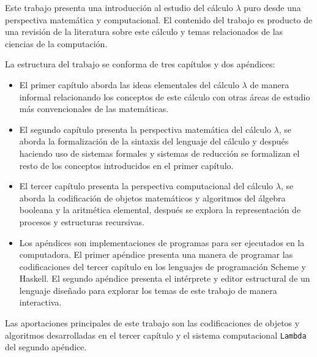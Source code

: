 Este trabajo presenta una introducción al estudio del cálculo \( λ \) puro desde una perspectiva matemática y computacional. El contenido del trabajo es producto de una revisión de la literatura sobre este cálculo y temas relacionados de las ciencias de la computación.

La estructura del trabajo se conforma de tres capítulos y dos apéndices:

\begin{itemize}
\item El primer capítulo aborda las ideas elementales del cálculo \( λ \) de manera informal relacionando los conceptos de este cálculo con otras áreas de estudio más convencionales de las matemáticas.

\item El segundo capítulo presenta la perspectiva matemática del cálculo \( λ \), se aborda la formalización de la sintaxis del lenguaje del cálculo y después haciendo uso de sistemas formales y sistemas de reducción se formalizan el resto de los conceptos introducidos en el primer capítulo.

\item El tercer capítulo presenta la perspectiva computacional del cálculo \( λ \), se aborda la codificación de objetos matemáticos y algoritmos del álgebra booleana y la aritmética elemental, después se explora la representación de procesos y estructuras recursivas.

\item Los apéndices son implementaciones de programas para ser ejecutados en la computadora. El primer apéndice presenta una manera de programar las codificaciones del tercer capítulo en los lenguajes de programación Scheme y Haskell. El segundo apéndice presenta el intérprete y editor estructural de un lenguaje diseñado para explorar los temas de este trabajo de manera interactiva.
\end{itemize}

Las aportaciones principales de este trabajo son las codificaciones de objetos y algoritmos desarrolladas en el tercer capítulo y el sistema computacional \texttt{Lambda} del segundo apéndice.
